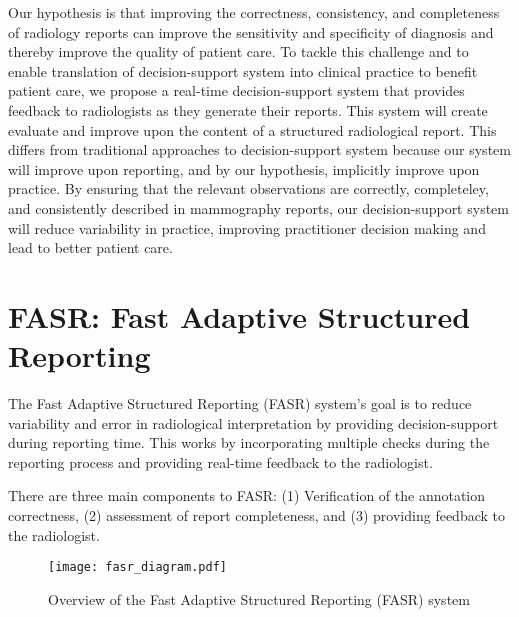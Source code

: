 Our hypothesis is that improving the correctness, consistency, and completeness of radiology reports can improve the sensitivity and specificity of diagnosis and thereby improve the quality of patient care. To tackle this challenge and to enable translation of decision-support system into clinical practice to benefit patient care, we propose a real-time decision-support system that provides feedback to radiologists as they generate their reports. This system will create evaluate and improve upon the content of a structured radiological report. This differs from traditional approaches to decision-support system because our system will improve upon reporting, and by our hypothesis, implicitly improve upon practice. By ensuring that the relevant observations are correctly, completeley, and consistently described in mammography reports, our decision-support system will reduce variability in practice, improving practitioner decision making and lead to better patient care.

\section{FASR: Fast Adaptive Structured Reporting}
The Fast Adaptive Structured Reporting (FASR) system's goal is to reduce variability and error in radiological interpretation by providing decision-support during reporting time. This works by incorporating multiple checks during the reporting process and providing real-time feedback to the radiologist.

There are three main components to FASR: (1) Verification of the annotation correctness, (2) assessment of report completeness, and (3) providing feedback to the radiologist.

\begin{figure}[h]
	\centering
	\texttt{[image: fasr\_diagram.pdf]}
	\caption{Overview of the Fast Adaptive Structured Reporting (FASR) system}
	\label{fig:fasr_diagram}
\end{figure}
